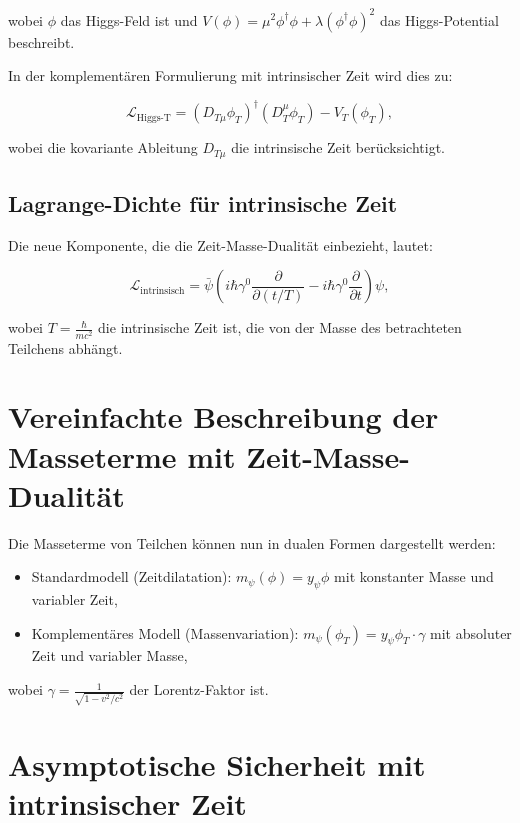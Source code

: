 \documentclass{article}
\begin{document}
	wobei $\phi$ das Higgs-Feld ist und $V(\phi) = \mu^2 \phi^\dagger \phi + \lambda (\phi^\dagger \phi)^2$ das Higgs-Potential beschreibt.
	
	In der komplementären Formulierung mit intrinsischer Zeit wird dies zu:
	
	\begin{equation}
		\mathcal{L}_\text{Higgs-T} = (D_{T\mu} \phi_T)^\dagger (D_T^\mu \phi_T) - V_T(\phi_T),
	\end{equation}
	
	wobei die kovariante Ableitung $D_{T\mu}$ die intrinsische Zeit berücksichtigt.
	
	\subsection{Lagrange-Dichte für intrinsische Zeit}
	Die neue Komponente, die die Zeit-Masse-Dualität einbezieht, lautet:
	
	\begin{equation}
		\mathcal{L}_\text{intrinsisch} = \bar{\psi}\left(i\hbar\gamma^0 \frac{\partial}{\partial (t/T)} - i\hbar\gamma^0 \frac{\partial}{\partial t}\right)\psi,
	\end{equation}
	
	wobei $T = \frac{\hbar}{mc^2}$ die intrinsische Zeit ist, die von der Masse des betrachteten Teilchens abhängt.
	
	\section{Vereinfachte Beschreibung der Masseterme mit Zeit-Masse-Dualität}
	
	Die Masseterme von Teilchen können nun in dualen Formen dargestellt werden:
	
	\begin{itemize}
		\item Standardmodell (Zeitdilatation): $m_\psi(\phi) = y_\psi \phi$ mit konstanter Masse und variabler Zeit,
		\item Komplementäres Modell (Massenvariation): $m_\psi(\phi_T) = y_\psi \phi_T \cdot \gamma$ mit absoluter Zeit und variabler Masse,
	\end{itemize}
	
	wobei $\gamma = \frac{1}{\sqrt{1-v^2/c^2}}$ der Lorentz-Faktor ist.
	
	\section{Asymptotische Sicherheit mit intrinsischer Zeit}
	
\end{document}
